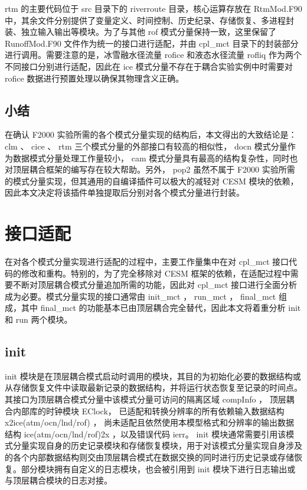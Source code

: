rtm 的主要代码位于 src 目录下的 riverroute 目录，核心运算存放在 RtmMod.F90 中，其余文件分别提供了变量定义、时间控制、历史纪录、存储恢复、多进程封装、独立输入输出等模块。为了与其他 rof 模式分量保持一致，这里保留了 RunoffMod.F90 文件作为统一的接口进行适配，并由 cpl\_mct 目录下的封装部分进行调用。需要注意的是，冰雪融水径流量 rofice 和液态水径流量 rofliq 作为两个不同接口分别进行适配，因此在 ice 模式分量不存在于耦合实验实例中时需要对 rofice 数据进行预置处理以确保其物理含义正确。

\subsection{小结}

在确认 F2000 实验所需的各个模式分量实现的结构后，本文得出的大致结论是： clm 、 cice 、 rtm 三个模式分量的外部接口有较高的相似性， docn 模式分量作为数据模式分量处理工作量较小， cam 模式分量具有最高的结构复杂性，同时也对顶层耦合框架的编写存在较大帮助。另外， pop2 虽然不属于 F2000 实验所需的模式分量实现，但其通用的自编译插件可以极大的减轻对 CESM 模块的依赖，因此本文决定将该插件单独提取后分别对各个模式分量进行封装。

\section{接口适配}

在对各个模式分量实现进行适配的过程中，主要工作量集中在对 cpl\_mct 接口代码的修改和重构。特别的，为了完全移除对 CESM 框架的依赖，在适配过程中需要不断对顶层耦合模式分量追加所需的功能，因此对 cpl\_mct 接口进行全面分析成为必要。模式分量实现的接口通常由 init\_mct ， run\_mct ， final\_mct 组成，其中 final\_mct 的功能基本已由顶层耦合完全替代，因此本文将着重分析 init 和 run 两个模块。

\subsection{init}

init 模块是在顶层耦合模式启动时调用的模块，其目的为初始化必要的数据结构或从存储恢复文件中读取最新记录的数据结构，并将运行状态恢复至记录的时间点。其接口为顶层耦合模式分量中该模式分量可访问的隔离区域 compInfo ， 顶层耦合内部库的时钟模块 EClock， 已适配和转换分辨率的所有依赖输入数据结构 x2ice(atm/ocn/lnd/rof) ， 尚未适配且依然使用本模型格式和分辨率的输出数据结构 ice(atm/ocn/lnd/rof)2x ，以及错误代码 ierr。 init 模块通常需要引用该模式分量实现自身的历史记录模块和存储恢复模块，用于对该模式分量实现自身涉及的各个内部数据结构则交由顶层耦合模式在数据交换的同时进行历史记录或存储恢复。部分模块拥有自定义的日志模块，也会被引用到 init 模块下进行日志输出或与顶层耦合模块的日志对接。

